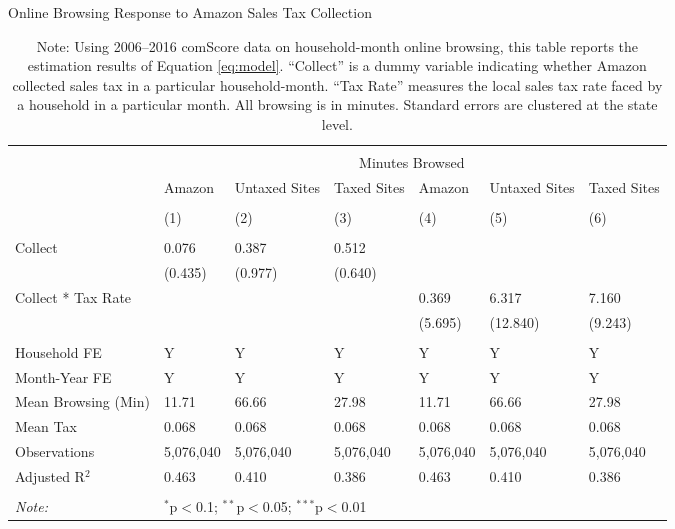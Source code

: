 
\begin{table}[!htbp] \centering
  \caption{Online Browsing Response to Amazon Sales Tax Collection}
  \label{tab:browsingDiD}
\begin{tabularx}{\textwidth}{lXXXXXX}
\\[-1.8ex]\hline
\hline \\[-1.8ex]
 & \multicolumn{6}{c}{Minutes Browsed} \\
\cline{2-7}
 & Amazon & Untaxed Sites & Taxed Sites & Amazon & Untaxed Sites & Taxed Sites \\
\\[-1.8ex] & (1) & (2) & (3) & (4) & (5) & (6)\\
\hline \\[-1.8ex]
 Collect & 0.076 & 0.387 & 0.512 &  &  &  \\
  & (0.435) & (0.977) & (0.640) &  &  &  \\
  Collect * Tax Rate &  &  &  & 0.369 & 6.317 & 7.160 \\
  &  &  &  & (5.695) & (12.840) & (9.243) \\
 \hline \\[-1.8ex]
Household FE & Y & Y & Y & Y & Y & Y \\
Month-Year FE & Y & Y & Y & Y & Y & Y \\
Mean Browsing (Min) & 11.71 & 66.66 & 27.98 & 11.71 & 66.66 & 27.98 \\
Mean Tax & 0.068 & 0.068 & 0.068 & 0.068 & 0.068 & 0.068 \\
Observations & 5,076,040 & 5,076,040 & 5,076,040 & 5,076,040 & 5,076,040 & 5,076,040 \\
Adjusted R$^{2}$ & 0.463 & 0.410 & 0.386 & 0.463 & 0.410 & 0.386 \\
\hline
\hline \\[-1.8ex]
\textit{Note:}  & \multicolumn{6}{l}{$^{*}$p$<$0.1; $^{**}$p$<$0.05; $^{***}$p$<$0.01} \\
\end{tabularx}
\caption*{Note: Using 2006--2016 comScore data on household-month online browsing, this table reports the estimation results of Equation \ref{eq:model}. ``Collect'' is a dummy variable indicating whether Amazon collected sales tax in a particular household-month. ``Tax Rate'' measures the local sales tax rate faced by a household in a particular month. All browsing is in minutes. Standard errors are clustered at the state level.}
\end{table}
